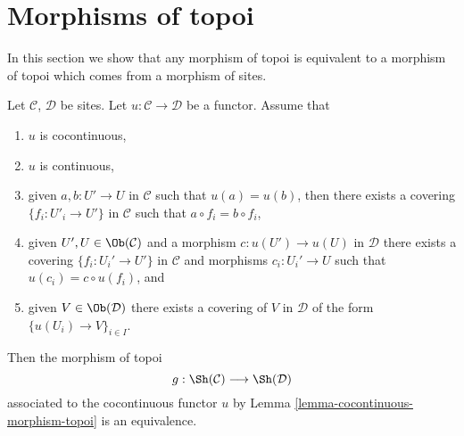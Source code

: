 \section{Morphisms of topoi}
\label{section-morphisms-topoi}

\noindent
In this section we show that any morphism of topoi is equivalent
to a morphism of topoi which comes from a morphism of sites.

\begin{lemma}
\label{lemma-equivalence}
Let $\mathcal{C}$, $\mathcal{D}$ be sites.
Let $u : \mathcal{C} \to \mathcal{D}$ be a functor.
Assume that
\begin{enumerate}
\item $u$ is cocontinuous,
\item $u$ is continuous,
\item given $a, b : U' \to U$ in $\mathcal{C}$ such that
$u(a) = u(b)$, then there exists a covering $\{f_i : U'_i \to U'\}$
in $\mathcal{C}$ such that $a \circ f_i = b \circ f_i$,
\item given $U', U \in \Ob(\mathcal{C})$ and
a morphism $c : u(U') \to u(U)$ in $\mathcal{D}$ there exists
a covering $\{f_i : U_i' \to U'\}$ in $\mathcal{C}$
and morphisms $c_i : U_i' \to U$ such that $u(c_i) = c \circ u(f_i)$, and
\item given $V \in \Ob(\mathcal{D})$ there exists a covering
of $V$ in $\mathcal{D}$ of the form $\{u(U_i) \to V\}_{i \in I}$.
\end{enumerate}
Then the morphism of topoi
$$
g : \Sh(\mathcal{C}) \longrightarrow \Sh(\mathcal{D})
$$
associated to the cocontinuous functor $u$ by
Lemma \ref{lemma-cocontinuous-morphism-topoi}
is an equivalence.
\end{lemma}

